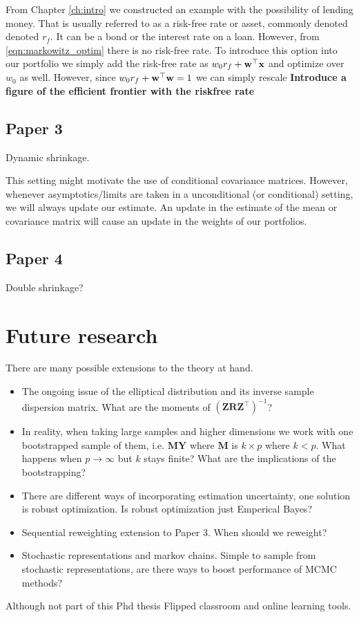 \documentclass[]{book}
\begin{document}
From Chapter \ref{ch:intro} we constructed an example with the possibility of lending money. That is usually referred to as a risk-free rate or asset, commonly denoted denoted $r_f$. It can be a bond or the interest rate on a loan. However, from \eqref{eqn:markowitz_optim} there is no risk-free rate. To introduce this option into our portfolio we simply add the risk-free rate as $w_0 r_f + \mathbf{w}^\top \mathbf{x}$ and optimize over $w_0$ as well. However, since $w_0 r_f + \mathbf{w}^\top \mathbf{w}=1$ we can simply rescale 
\textbf{Introduce a figure of the efficient frontier with the riskfree rate}
\section*{Paper 3}
Dynamic shrinkage.

This setting might motivate the use of conditional covariance matrices. However, whenever asymptotics/limits are taken in a unconditional (or conditional) setting, we will always update our estimate. An update in the estimate of the mean or covariance matrix will cause an update in the weights of our portfolios. 
\section*{Paper 4}
Double shrinkage?
\chapter{Future research}
There are many possible extensions to the theory at hand. 

\begin{itemize}
	\item The ongoing issue of the elliptical distribution and its inverse sample dispersion matrix. What are the moments of $(\mathbf{Z} \mathbf{R} \mathbf{Z}^\top)^{-1}$?
	\item In reality, when taking large samples and higher dimensions we work with one bootstrapped sample of them, i.e. $\mathbf{M} \mathbf{Y}$ where $\mathbf{M}$ is $k \times p$ where $k<p$. What happens when $p \rightarrow \infty$ but $k$ stays finite? What are the implications of the bootstrapping? 
	\item There are different ways of incorporating estimation uncertainty, one solution is robust optimization. Is robust optimization just Emperical Bayes?
	\item Sequential reweighting extension to Paper 3. When should we reweight?
	\item Stochastic representations and markov chains. Simple to sample from stochastic representations, are there ways to boost performance of MCMC methods?
\end{itemize}

Although not part of this Phd thesis Flipped classroom and online learning tools.


\end{document}
